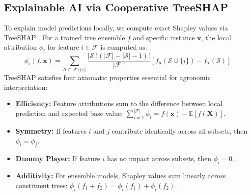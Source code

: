 \documentclass[conference]{IEEEtran}
\begin{document}
\subsection{Explainable AI via Cooperative TreeSHAP}
To explain model predictions locally, we compute exact Shapley values via TreeSHAP \cite{lundberg2020}. For a trained tree ensemble $f$ and specific instance $\mathbf{x}$, the local attribution $\phi_i$ for feature $i \in \mathcal{F}$ is computed as:
\begin{equation}
\phi_i(f, \mathbf{x}) = \sum_{\mathcal{S} \subseteq \mathcal{F} \setminus \{i\}} \frac{|\mathcal{S}|!(|\mathcal{F}| - |\mathcal{S}| - 1)!}{|\mathcal{F}|!} \left[ f_{\mathbf{x}}(\mathcal{S} \cup \{i\}) - f_{\mathbf{x}}(\mathcal{S}) \right]
\end{equation}
TreeSHAP satisfies four axiomatic properties essential for agronomic interpretation:
\begin{itemize}
    \item \textbf{Efficiency:} Feature attributions sum to the difference between local prediction and expected base value: $\sum_{i=1}^{|\mathcal{F}|} \phi_i = f(\mathbf{x}) - \mathbb{E}[f(\mathbf{X})]$.
    \item \textbf{Symmetry:} If features $i$ and $j$ contribute identically across all subsets, then $\phi_i = \phi_j$.
    \item \textbf{Dummy Player:} If feature $i$ has no impact across subsets, then $\phi_i = 0$.
    \item \textbf{Additivity:} For ensemble models, Shapley values sum linearly across constituent trees: $\phi_i(f_1 + f_2) = \phi_i(f_1) + \phi_i(f_2)$.
\end{itemize}
\end{document}
